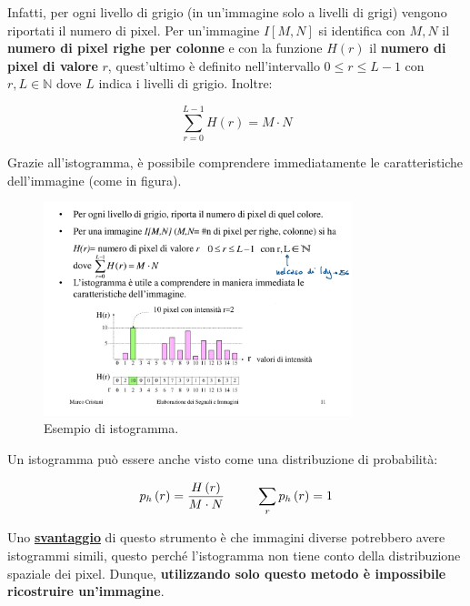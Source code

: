 \documentclass[a4paper]{article}
\begin{document}
	\noindent
	Infatti, per ogni livello di grigio (in un'immagine solo a livelli di grigi) vengono riportati il numero di pixel. Per un'immagine $I\left[M,N\right]$ si identifica con $M,N$ il \textbf{numero di pixel righe per colonne} e con la funzione $H\left(r\right)$ il \textbf{numero di pixel di valore} $r$, quest'ultimo è definito nell'intervallo $0 \le r \le L-1$ con $r,L \in \mathbb{N}$ dove $L$ indica i livelli di grigio. Inoltre:
	
	\begin{equation*}
		\sum_{r = 0}^{L - 1} H\left(r\right) = M \cdot N
	\end{equation*}

	\noindent
	Grazie all'istogramma, è possibile comprendere immediatamente le caratteristiche dell'immagine (come in figura).
	
	\begin{figure}[!htp]
		\centering
		\includegraphics[width=0.8\textwidth]{img/istogramma.pdf}
		\caption{Esempio di istogramma.}
	\end{figure}

	\noindent
	Un istogramma può essere anche visto come una distribuzione di probabilità:
	
	\begin{equation*}
		p_{h}\left(r\right) = \dfrac{H\left(r\right)}{M \cdot N} \hspace{2.5em} \sum_{r} p_{h}\left(r\right) = 1
	\end{equation*}

	\noindent
	Uno \textcolor{Red3}{\textbf{\underline{svantaggio}}} di questo strumento è che immagini diverse potrebbero avere istogrammi simili, questo perché l'istogramma non tiene conto della distribuzione spaziale dei pixel. Dunque, \textbf{utilizzando solo questo metodo è impossibile ricostruire un'immagine}.\newline
	
\end{document}
